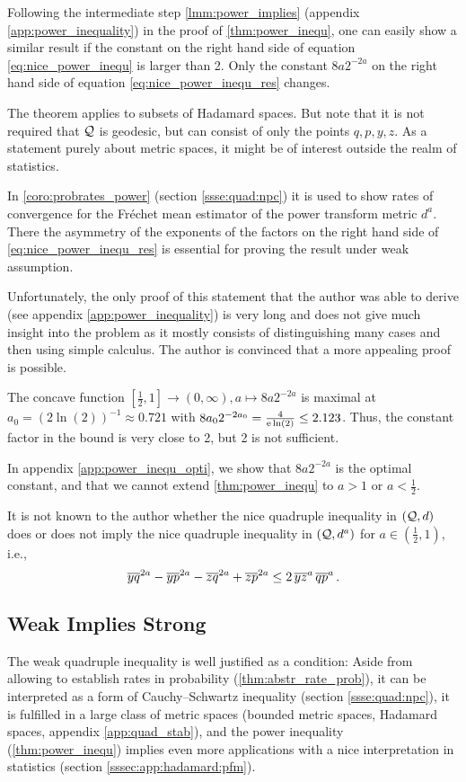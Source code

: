 Following the intermediate step \autoref{lmm:power_implies} (appendix \autoref{app:power_inequality}) in the proof of \autoref{thm:power_inequ}, one can easily show a similar result if the constant on the right hand side of equation \eqref{eq:nice_power_inequ} is larger than 2. Only the constant $8 a 2^{-2a}$ on the right hand side of equation \eqref{eq:nice_power_inequ_res} changes.

The theorem applies to subsets of Hadamard spaces. But note that it is not required that $\mathcal{Q}$ is geodesic, but can consist of only the points $q,p,y,z$.  As a statement purely about metric spaces, it might be of interest outside the realm of statistics.  

In \autoref{coro:probrates_power} (section \ref{ssse:quad:npc}) it is used to show rates of  convergence for the Fréchet mean estimator of the power transform metric $d^a$. There the asymmetry of the exponents of the factors on the right hand side of  \eqref{eq:nice_power_inequ_res} is essential for proving the result under weak assumption. 

Unfortunately, the only proof of this statement that the author was able to derive (see appendix \ref{app:power_inequality}) is very long and does not give much insight into the problem as it mostly consists of distinguishing many cases and then using simple calculus. The author is convinced that a more appealing proof is possible.

The concave function $[\frac12, 1] \to (0,\infty), a\mapsto8a2^{-2a}$ is maximal at $a_0 = (2\ln(2))^{-1} \approx 0.721$ with $8a_02^{-2a_0} = \frac{4}{\mathrm{e} \ln(2)} \leq 2.123$. Thus, the constant factor in the bound is very close to 2, but 2 is not sufficient.

In appendix \autoref{app:power_inequ_opti}, we show that $8a2^{-2a}$ is the optimal constant, and that we cannot extend \autoref{thm:power_inequ} to $a > 1$ or $a < \frac12$.

It is not known to the author whether the nice quadruple inequality in $(\mathcal{Q}, d)$ does or does not imply the nice quadruple inequality in $(\mathcal{Q}, d^a)$ for $a \in (\frac12, 1)$, i.e.,
\begin{equation*}
	\overline{yq}^{2a} - \overline{yp}^{2a} - \overline{zq}^{2a} + \overline{zp}^{2a} \leq 2 \, \overline{yz}^{a}\, \overline{qp}^{a}
	\, .
\end{equation*}
%
%
%
\subsection{Weak Implies Strong}\label{ssec:weak_implies_strong}
%
The weak quadruple inequality is well justified as a condition: Aside from allowing to establish rates in probability (\autoref{thm:abstr_rate_prob}), it can be interpreted as a form of Cauchy--Schwartz inequality (section \ref{ssse:quad:npc}), it is fulfilled in a large class of metric spaces (bounded metric spaces, Hadamard spaces, appendix \autoref{app:quad_stab}), and the power inequality (\autoref{thm:power_inequ}) implies even more applications with a nice interpretation in statistics (section \ref{sssec:app:hadamard:pfm}).


